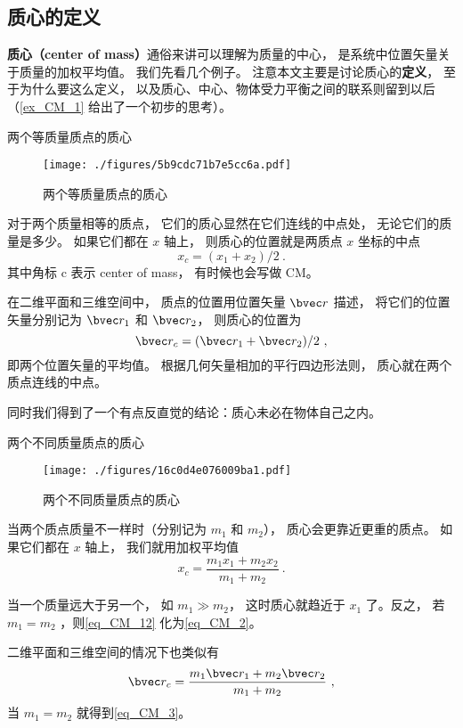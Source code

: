 

\subsection{质心的定义}
\textbf{质心（center of mass）}通俗来讲可以理解为质量的中心， 是系统中位置矢量关于质量的加权平均值。 我们先看几个例子。 注意本文主要是讨论质心的\textbf{定义}， 至于为什么要这么定义， 以及质心、中心、物体受力平衡之间的联系则留到以后（\autoref{ex_CM_1} 给出了一个初步的思考）。

\begin{example}{两个等质量质点的质心}

\begin{figure}[ht]
\centering
\texttt{[image: ./figures/5b9cdc71b7e5cc6a.pdf]}
\caption{两个等质量质点的质心} \label{fig_CM_4}
\end{figure}
对于两个质量相等的质点， 它们的质心显然在它们连线的中点处， 无论它们的质量是多少。 如果它们都在 $x$ 轴上， 则质心的位置就是两质点 $x$ 坐标的中点
\begin{equation}\label{eq_CM_2}
x_c = (x_1 + x_2)/2~.
\end{equation}
其中角标 c 表示 center of mass， 有时候也会写做 CM。

在二维平面和三维空间中， 质点的位置用位置矢量 $\bvec r$ 描述， 将它们的位置矢量分别记为 $\bvec r_1$ 和 $\bvec r_2$， 则质心的位置为
\begin{equation}\label{eq_CM_3}
\bvec r_c = (\bvec r_1 + \bvec r_2)/2~,
\end{equation}
即两个位置矢量的平均值。 根据几何矢量相加的平行四边形法则， 质心就在两个质点连线的中点。

同时我们得到了一个有点反直觉的结论：质心未必在物体自己之内。
\end{example}

\begin{example}{两个不同质量质点的质心}
\begin{figure}[ht]
\centering
\texttt{[image: ./figures/16c0d4e076009ba1.pdf]}
\caption{两个不同质量质点的质心} \label{fig_CM_5}
\end{figure}
当两个质点质量不一样时（分别记为 $m_1$ 和 $m_2$）， 质心会更靠近更重的质点。 如果它们都在 $x$ 轴上， 我们就用加权平均值
\begin{equation}\label{eq_CM_12}
x_c = \frac{m_1 x_1 + m_2 x_2}{m_1 + m_2}~.
\end{equation}

当一个质量远大于另一个， 如 $m_1 \gg m_2$， 这时质心就趋近于 $x_1$ 了。反之， 若$m_1 = m_2$ ，则\autoref{eq_CM_12} 化为\autoref{eq_CM_2}。

二维平面和三维空间的情况下也类似有
\begin{equation}\label{eq_CM_5}
\bvec r_c = \frac{m_1 \bvec r_1 + m_2 \bvec r_2}{m_1 + m_2}~,
\end{equation}
当 $m_1 = m_2$ 就得到\autoref{eq_CM_3}。
\end{example}

